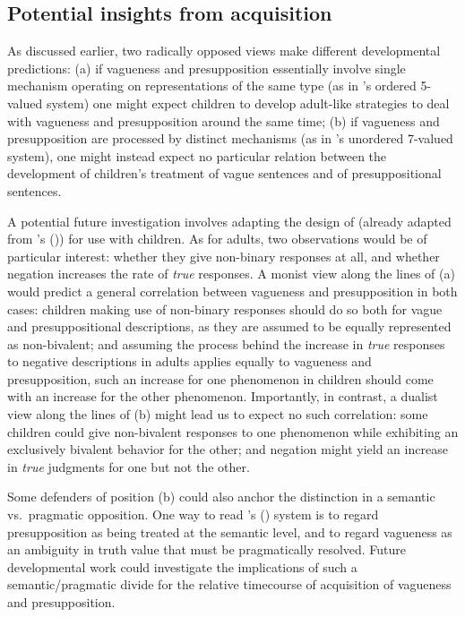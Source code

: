 \documentclass[12pt, letterpaper]{article}
\newcommand\posscite[1]{\citeauthor{#1}'s (\citeyear{#1})}
\begin{document}
{\subsection{Potential insights from acquisition} 

As discussed earlier, two radically opposed views make different developmental predictions: (a) if vagueness and presupposition essentially involve single mechanism operating on representations of the same type (as in \cite{Zehr:2014}'s ordered 5-valued system) one might expect children to develop adult-like strategies to deal with vagueness and presupposition around the same time; %
(b) if vagueness and presupposition are processed by distinct mechanisms (as in \cite{spector2015:7valued}'s unordered 7-valued system), one might instead expect no particular relation between the development of children's treatment of vague sentences and of presuppositional sentences.

A potential future investigation involves adapting the design of \cite{Zehr:2014} (already adapted from \posscite{Kriz:2015}) for use with children. As for adults, two observations would be of particular interest: whether they give non-binary responses at all, and whether negation increases the rate of \textit{true} responses. A monist view along the lines of (a) would predict a general correlation between vagueness and presupposition in both cases: children making use of non-binary responses should do so both for vague and presuppositional descriptions, as they are assumed to be equally represented as non-bivalent; and assuming the process behind the increase in \textit{true} responses to negative descriptions in adults applies equally to vagueness and presupposition, such an increase for one phenomenon in children should come with an increase for the other phenomenon. Importantly, in contrast, a dualist view along the lines of (b) might lead us to expect no such correlation: some children could give non-bivalent responses to one phenomenon while exhibiting an exclusively bivalent behavior for the other; and negation might yield an increase in \textit{true} judgments for one but not the other.

Some defenders of position (b) could also anchor the distinction in a semantic vs.~pragmatic opposition. One way to read \posscite{spector2015:7valued} system is to regard presupposition as being treated at the semantic level, and to regard vagueness as an ambiguity in truth value that must be pragmatically resolved. Future developmental work could investigate the implications of such a semantic/pragmatic divide for the relative timecourse of acquisition of vagueness and presupposition.

}
\end{document}
